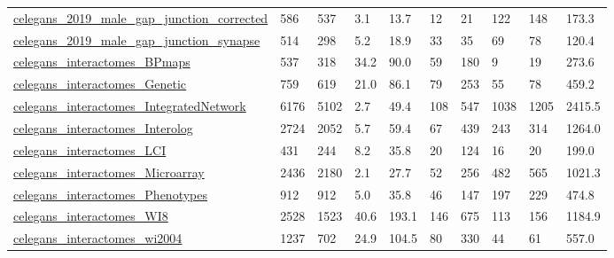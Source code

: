 \begin{longtable}{llllllllll}
 \href{https://wormwiring.org/pages/adjacency.html}{celegans\_2019\_male\_gap\_junction\_corrected}                              & 586        & 537   & 3.1    & 13.7   & 12    & 21     & 122    & 148    & 173.3   \\
 \href{https://wormwiring.org/pages/adjacency.html}{celegans\_2019\_male\_gap\_junction\_synapse}                                & 514        & 298   & 5.2    & 18.9   & 33    & 35     & 69     & 78     & 120.4   \\
 \href{http://interactome.dfci.harvard.edu/C_elegans/index.php?page=download}{celegans\_interactomes\_BPmaps}                 & 537        & 318   & 34.2   & 90.0   & 59    & 180    & 9      & 19     & 273.6   \\
 \href{http://interactome.dfci.harvard.edu/C_elegans/index.php?page=download}{celegans\_interactomes\_Genetic}                & 759        & 619   & 21.0   & 86.1   & 79    & 253    & 55     & 78     & 459.2   \\
 \href{http://interactome.dfci.harvard.edu/C_elegans/index.php?page=download}{celegans\_interactomes\_IntegratedNetwork}      & 6176       & 5102  & 2.7    & 49.4   & 108   & 547    & 1038   & 1205   & 2415.5  \\
 \href{http://interactome.dfci.harvard.edu/C_elegans/index.php?page=download}{celegans\_interactomes\_Interolog}              & 2724       & 2052  & 5.7    & 59.4   & 67    & 439    & 243    & 314    & 1264.0  \\
 \href{http://interactome.dfci.harvard.edu/C_elegans/index.php?page=download}{celegans\_interactomes\_LCI}                    & 431        & 244   & 8.2    & 35.8   & 20    & 124    & 16     & 20     & 199.0   \\
 \href{http://interactome.dfci.harvard.edu/C_elegans/index.php?page=download}{celegans\_interactomes\_Microarray}             & 2436       & 2180  & 2.1    & 27.7   & 52    & 256    & 482    & 565    & 1021.3  \\
 \href{http://interactome.dfci.harvard.edu/C_elegans/index.php?page=download}{celegans\_interactomes\_Phenotypes}             & 912        & 912   & 5.0    & 35.8   & 46    & 147    & 197    & 229    & 474.8   \\
 \href{http://interactome.dfci.harvard.edu/C_elegans/index.php?page=download}{celegans\_interactomes\_WI8}                    & 2528       & 1523  & 40.6   & 193.1  & 146   & 675    & 113    & 156    & 1184.9  \\
 \href{http://interactome.dfci.harvard.edu/C_elegans/index.php?page=download}{celegans\_interactomes\_wi2004}                 & 1237       & 702   & 24.9   & 104.5  & 80    & 330    & 44     & 61     & 557.0   \\

\end{longtable}
